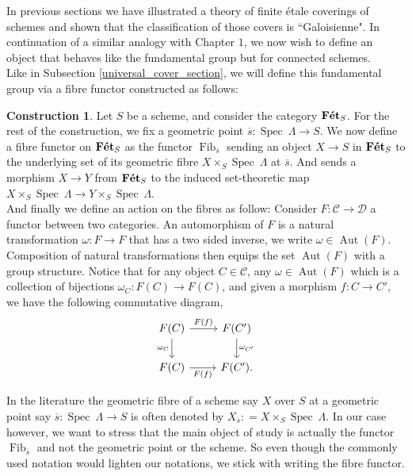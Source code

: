 \documentclass{article}
\theoremstyle{plain}
\theoremstyle{definition}
\newtheorem{construction}[theorem]{Construction}
\DeclareMathOperator{\Fib}{Fib}
\DeclareMathOperator{\Aut}{Aut}
\DeclareMathOperator{\Spec}{Spec}
\DeclareMathOperator{\Fet}{\bf{F\acute{e}t}}
\begin{document}
In previous sections we have illustrated a theory of finite \'etale coverings of schemes and shown that the classification of those covers is ``Galoisienne".
In continuation of a similar analogy with Chapter $1$, we now wish to define an object that behaves like the fundamental group but for connected schemes.\\
Like in Subsection \ref{universal_cover_section}, we will define this fundamental group via a fibre functor constructed as follows:    

\begin{construction}
    Let $S$ be a scheme, and consider the category $\Fet_S$.
    For the rest of the construction, we fix a geometric point $\overline{s}:\Spec\:\Lambda \rightarrow S$. 
    We now define a fibre functor on $\Fet_S$ as
    the functor $\Fib_{\overline{s}}$ sending an object $X\rightarrow S$ in $\Fet_S$ to the underlying set of its geometric fibre $X\times_S\Spec\:\Lambda$ at $\overline{s}$. 
    And sends a morphism $X\rightarrow Y$ from $\Fet_S$ to the induced set-theoretic map $X\times_S\Spec\:\Lambda \rightarrow Y\times_S\Spec\:\Lambda$.\\
    And finally we define an action on the fibres as follow:
    Consider $F:\mathcal{C}\rightarrow\mathcal{D}$ a functor between two categories.
    An automorphism of $F$ is a natural transformation $\omega:F\rightarrow F $ that has a two sided inverse, we write $\omega \in \Aut(F)$. Composition of natural transformations then equips the set $\Aut(F)$ with a group structure. 
    Notice that for any object $C\in \mathcal{C}$, any $\omega\in \Aut(F)$ which is a collection of bijections $\omega_C : F(C)\rightarrow F(C)$, and given a morphism $f:C\rightarrow C'$, we have the following commutative diagram,
    \[
    \begin{tikzcd}
        F(C) \arrow[r,"F(f)"] \arrow[d, "\omega_C"'] & F(C') \arrow[d,"\omega_{C'}"] \\
        F(C) \arrow[r,"F(f)"'] &  F(C').
    \end{tikzcd}
    \]
\end{construction}



\noindent In the literature the geometric fibre of a scheme say $X$ over $S$ at a geometric point say $\overline{s}:\Spec\:\Lambda \rightarrow S$ is often denoted by $X_{\overline{s}} : = X\times_S\Spec\:\Lambda$. 
In our case however, we want to stress that the main object of study is actually the functor $\Fib_{\overline{s}}$ and not the geometric point or the scheme.
So even though the commonly used notation would lighten our notations, we stick with writing the fibre functor. 
\end{document}
